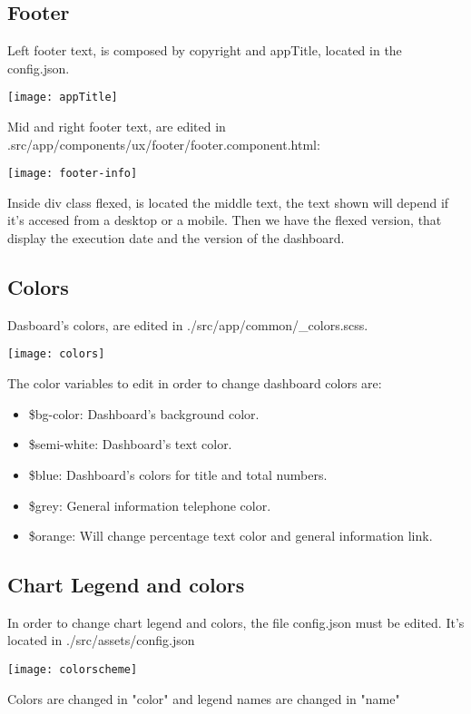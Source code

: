 \documentclass[12pt]{article}
\begin{document}
\subsection{Footer}
Left footer text, is composed by copyright and appTitle, located in the config.json.\par
\begin{center} %
	\texttt{[image: appTitle]}
\end{center}
Mid and right footer text, are edited in .src/app/components/ux/footer/footer.component.html:\par
\begin{center} %
	\texttt{[image: footer-info]}
\end{center}
Inside div class flexed, is located the middle text, the text shown will depend if it's accesed from a desktop or a mobile. Then we have the flexed version, that display the execution date and the version of the dashboard.\par
\newpage
\subsection{Colors}
Dasboard's colors, are edited in ./src/app/common/\_colors.scss.\par
\begin{center} %
	\texttt{[image: colors]}
\end{center}
The color variables to edit in order to change dashboard colors are:\par
\begin{itemize} %
	\item \$bg-color: Dashboard's background color.
	\item \$semi-white: Dashboard's text color.
	\item \$blue: Dashboard's colors for title and total numbers.
	\item \$grey: General information telephone color.
	\item \$orange: Will change percentage text color and general information link.
\end{itemize}

\subsection{Chart Legend and colors}
In order to change chart legend and colors, the file config.json must be edited. It's located in ./src/assets/config.json\par
\begin{center} %
	\texttt{[image: colorscheme]}
\end{center}
Colors are changed in "color" and legend names are changed in "name"\par
\end{document}
